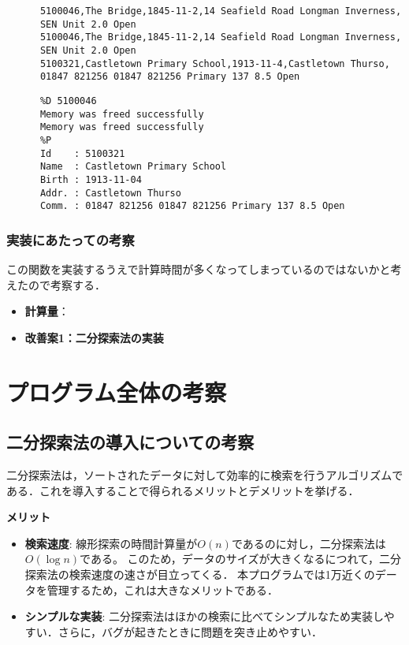     \begin{verbatim}
      5100046,The Bridge,1845-11-2,14 Seafield Road Longman Inverness,
      SEN Unit 2.0 Open
      5100046,The Bridge,1845-11-2,14 Seafield Road Longman Inverness,
      SEN Unit 2.0 Open
      5100321,Castletown Primary School,1913-11-4,Castletown Thurso,
      01847 821256 01847 821256 Primary 137 8.5 Open
    \end{verbatim}
    \begin{verbatim}
      %D 5100046
      Memory was freed successfully
      Memory was freed successfully
      %P
      Id    : 5100321
      Name  : Castletown Primary School
      Birth : 1913-11-04
      Addr. : Castletown Thurso
      Comm. : 01847 821256 01847 821256 Primary 137 8.5 Open
    \end{verbatim}
    \subsubsection{実装にあたっての考察}
    この関数を実装するうえで計算時間が多くなってしまっているのではないかと考えたので考察する．
    \begin{itemize}
      \item \textbf{計算量}：
        \texttt{}
      \item \textbf{改善案1：二分探索法の実装}
    \end{itemize}
\section{プログラム全体の考察}\label{cosider}
  \subsection{二分探索法の導入についての考察}\label{cosider1}
  二分探索法は，ソートされたデータに対して効率的に検索を行うアルゴリズムである．これを導入することで得られるメリットとデメリットを挙げる．

    \textbf{メリット}
    \begin{itemize}
    \item \textbf{検索速度}:
    線形探索の時間計算量が$O(n)$であるのに対し，二分探索法は$O(\log n)$である。
    このため，データのサイズが大きくなるにつれて，二分探索法の検索速度の速さが目立ってくる．
    本プログラムでは1万近くのデータを管理するため，これは大きなメリットである．
    \item \textbf{シンプルな実装}:
    二分探索法はほかの検索に比べてシンプルなため実装しやすい．さらに，バグが起きたときに問題を突き止めやすい．
    \end{itemize}

